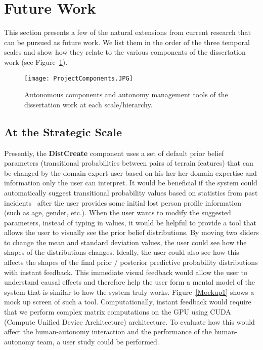 \section{Future Work}
\label{futurework}

This section presents a few of the natural extensions from current research that can be pursued as future work. We list them in the order of the three temporal scales and show how they relate to the various components of the dissertation work (see Figure~\ref{ProjectComponents2}).

\begin{figure}
\centering
\texttt{[image: ProjectComponents.JPG]}
\caption{Autonomous components and autonomy management tools of the dissertation work at each scale/hierarchy.}
\label{ProjectComponents2}
\end{figure}

\subsection{At the Strategic Scale}

Presently, the \textbf{DistCreate} component uses a set of default prior belief parameters (transitional probabilities between pairs of terrain features) that can be changed by the domain expert user based on his her her domain expertise and information only the user can interpret. It would be beneficial if the system could automatically suggest transitional probability values based on statistics from past incidents~\cite{Koester2008Lost} after the user provides some initial lost person profile information (such as age, gender, etc.). When the user wants to modify the suggested parameters, instead of typing in values, it would be helpful to provide a tool that allows the user to visually see the prior belief distributions. By moving two sliders to change the mean and standard deviation values, the user could see how the shapes of the distributions changes. Ideally, the user could also see how this affects the shapes of the final prior / posterior predictive probability distributions with instant feedback. This immediate visual feedback would allow the user to understand causal effects and therefore help the user form a mental model of the system that is similar to how the system truly works. Figure~\ref{Mockup1} shows a mock up screen of such a tool. Computationally, instant feedback would require that we perform complex matrix computations on the GPU using CUDA (Compute Unified Device Architecture) architecture. To evaluate how this would affect the human-autonomy interaction and the performance of the human-autonomy team, a user study could be performed.

